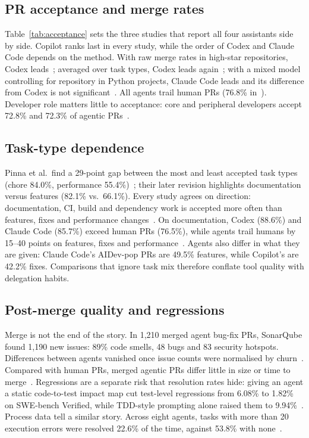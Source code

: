 \documentclass[conference]{IEEEtran}
\begin{document}
\subsection{PR acceptance and merge rates}

Table~\ref{tab:acceptance} sets the three studies that report all four assistants side by side. Copilot
ranks last in every study, while the order of Codex and Claude Code depends on the method. With raw merge
rates in high-star repositories, Codex leads~\cite{li2025teammates}; averaged over task types, Codex leads
again~\cite{rahman2026}; with a mixed model controlling for repository in Python projects, Claude Code
leads and its difference from Codex is not significant~\cite{mazloomzadeh2026}. All agents trail human PRs
(76.8\% in~\cite{li2025teammates}). Developer role matters little to acceptance: core and peripheral
developers accept 72.8\% and 72.3\% of agentic PRs~\cite{cynthia2026core}.

\subsection{Task-type dependence}
Pinna et al.\ find a 29-point gap between the most and least accepted task types (chore 84.0\%, performance
55.4\%)~\cite{pinna2026}; their later revision highlights documentation versus features (82.1\% vs.\
66.1\%). Every study agrees on direction: documentation, CI, build and dependency work is accepted more
often than features, fixes and performance changes~\cite{rahman2026,mazloomzadeh2026,li2025teammates}. On
documentation, Codex (88.6\%) and Claude Code (85.7\%) exceed human PRs (76.5\%), while agents trail humans
by 15--40 points on features, fixes and performance~\cite{li2025teammates}. Agents also differ in what they
are given: Claude Code's AIDev-pop PRs are 49.5\% features, while Copilot's are 42.2\% fixes. Comparisons
that ignore task mix therefore conflate tool quality with delegation habits.

\subsection{Post-merge quality and regressions}
Merge is not the end of the story. In 1,210 merged agent bug-fix PRs, SonarQube found 1,190 new issues:
89\% code smells, 48 bugs and 83 security hotspots. Differences between agents vanished once issue counts
were normalised by churn~\cite{cynthia2026postmerge}. Compared with human PRs, merged agentic PRs differ
little in size or time to merge~\cite{mazloomzadeh2026}. Regressions are a separate risk that resolution
rates hide: giving an agent a static code-to-test impact map cut test-level regressions from 6.08\% to
1.82\% on SWE-bench Verified, while TDD-style prompting alone raised them to 9.94\%~\cite{alonso2026tdad}.
Process data tell a similar story. Across eight agents, tasks with more than 20 execution errors were
resolved 22.6\% of the time, against 53.8\% with none~\cite{chen2026beyond}.
\end{document}
